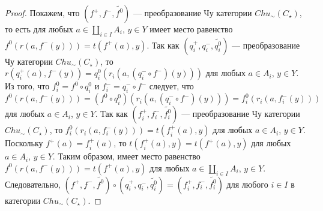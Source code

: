 \documentclass[a4paper,12pt]{article}
\begin{document}
\begin{proof}
    Покажем, что $(f^+,f^-,\widetilde{f^0})$ --- преобразование Чу категории $Chu_\sim(C_\star)$, то есть для любых $a \in \coprod_{i \in I} A_i$, $y \in Y$ имеет место равенство $f^0(r(a,f^-(y))) = t(f^+(a),y)$. Так как $(q^+_i,q^-_i,\widetilde{q^0_i})$ --- преобразование Чу категории $Chu_\sim(C_\star)$, то $r(q^+_i(a),f^-(y)) = q^0_i(r_i(a,(q^-_i \circ f^-)(y)))$ для любых $a \in A_i$, $y \in Y$. Из того, что $f^0_i = f^0 \circ q^0_i$ и $f^-_i = q^-_i \circ f^-$ следует, что $f^0(r(a,f^-(y))) = (f^0 \circ q^0_i)(r_i(a,(q^-_i \circ f^-)(y))) = f^0_i(r_i(a,f^-_i(y)))$ для любых $a \in A_i$, $y \in Y$. Так как $(f^+_i,f^-_i,\widetilde{f^0_i})$ --- преобразование Чу категории $Chu_\sim(C_\star)$, то $f^0_i(r_i(a,f^-_i(y))) = t(f^+_i(a),y)$ для любых $a \in A_i$, $y \in Y$. Поскольку $f^+(a) = f^+_i(a)$, то $t(f^+_i(a),y) = t(f^+(a),y)$ для любых $a \in A_i$, $y \in Y$. Таким образом, имеет место равенство $f^0(r(a,f^-(y))) = t(f^+(a),y)$ для любых $a \in \coprod_{i \in I} A_i$, $y \in Y$.
    Следовательно, $(f^+,f^-,\widetilde{f^0}) \circ (q^+_i, q^-_i, \widetilde{q^0_i}) = (f^+_i, f^-_i, \widetilde{f^0_i})$ для любого $i \in I$ в категории $Chu_\sim(C_\star)$.
\end{proof}
\end{document}
